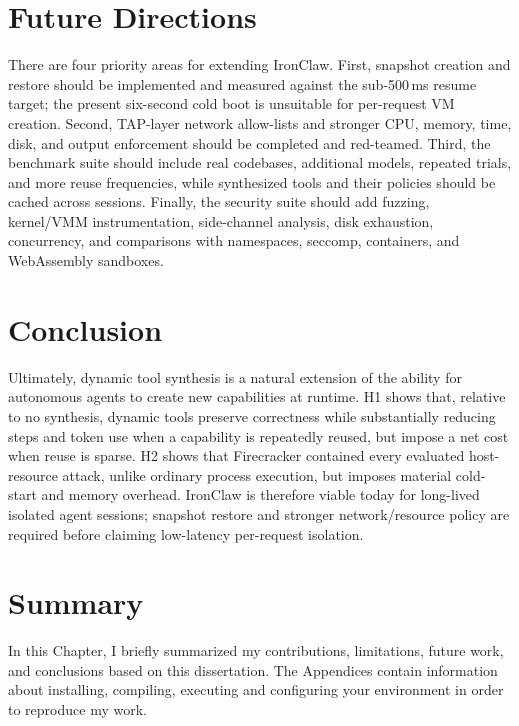 \section{Future Directions}
There are four priority areas for extending IronClaw. First, snapshot creation and restore should be implemented and measured against the sub-500\,ms resume target; the present six-second cold boot is unsuitable for per-request VM creation. Second, TAP-layer network allow-lists and stronger CPU, memory, time, disk, and output enforcement should be completed and red-teamed. Third, the benchmark suite should include real codebases, additional models, repeated trials, and more reuse frequencies, while synthesized tools and their policies should be cached across sessions. Finally, the security suite should add fuzzing, kernel/VMM instrumentation, side-channel analysis, disk exhaustion, concurrency, and comparisons with namespaces, seccomp, containers, and WebAssembly sandboxes.

\section{Conclusion}
Ultimately, dynamic tool synthesis is a natural extension of the ability for autonomous agents to create new capabilities at runtime. H1 shows that, relative to no synthesis, dynamic tools preserve correctness while substantially reducing steps and token use when a capability is repeatedly reused, but impose a net cost when reuse is sparse. H2 shows that Firecracker contained every evaluated host-resource attack, unlike ordinary process execution, but imposes material cold-start and memory overhead. IronClaw is therefore viable today for long-lived isolated agent sessions; snapshot restore and stronger network/resource policy are required before claiming low-latency per-request isolation.

\section{Summary}
In this Chapter, I briefly summarized my contributions, limitations, future work, and conclusions based on this dissertation. The Appendices contain information about installing, compiling, executing and configuring your environment in order to reproduce my work.
